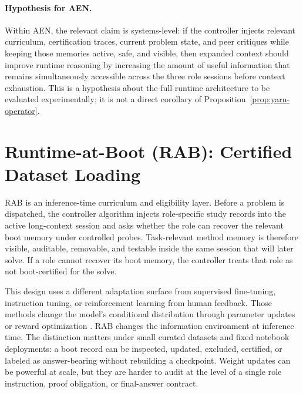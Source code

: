 \documentclass[11pt]{article}
\newcommand{\rab}{RAB}
\begin{document}
\paragraph{Hypothesis for AEN.}
Within AEN, the relevant claim is systems-level: if the controller injects relevant curriculum, certification traces, current problem state, and peer critiques while keeping those memories active, safe, and visible, then expanded context should improve runtime reasoning by increasing the amount of useful information that remains simultaneously accessible across the three role sessions before context exhaustion. This is a hypothesis about the full runtime architecture to be evaluated experimentally; it is not a direct corollary of Proposition~\ref{prop:yarn-operator}.

\section{Runtime-at-Boot (RAB): Certified Dataset Loading}

\rab{} is an inference-time curriculum and eligibility layer. Before a problem is dispatched, the controller algorithm injects role-specific study records into the active long-context session and asks whether the role can recover the relevant boot memory under controlled probes. Task-relevant method memory is therefore visible, auditable, removable, and testable inside the same session that will later solve. If a role cannot recover its boot memory, the controller treats that role as not boot-certified for the solve.

This design uses a different adaptation surface from supervised fine-tuning, instruction tuning, or reinforcement learning from human feedback. Those methods change the model's conditional distribution through parameter updates or reward optimization \citep{wei2021finetuned,christiano2017deep,ouyang2022training}. \rab{} changes the information environment at inference time. The distinction matters under small curated datasets and fixed notebook deployments: a boot record can be inspected, updated, excluded, certified, or labeled as answer-bearing without rebuilding a checkpoint. Weight updates can be powerful at scale, but they are harder to audit at the level of a single role instruction, proof obligation, or final-answer contract.
\end{document}
